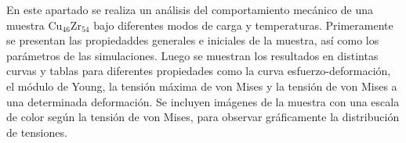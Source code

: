 



En este apartado se realiza un análisis del comportamiento mecánico de una muestra Cu$_{46}$Zr$_{54}$ bajo diferentes modos de carga y temperaturas. Primeramente se presentan las propiedaddes generales e iniciales de la muestra, así como los parámetros de las simulaciones. Luego se muestran los resultados en distintas curvas y tablas para diferentes propiedades como la curva esfuerzo-deformación, el módulo de Young, la tensión máxima de von Mises y la tensión de von Mises a una determinada deformación.
Se incluyen imágenes de la muestra con una escala de color según la tensión de von Mises, para observar gráficamente la distribución de tensiones.

